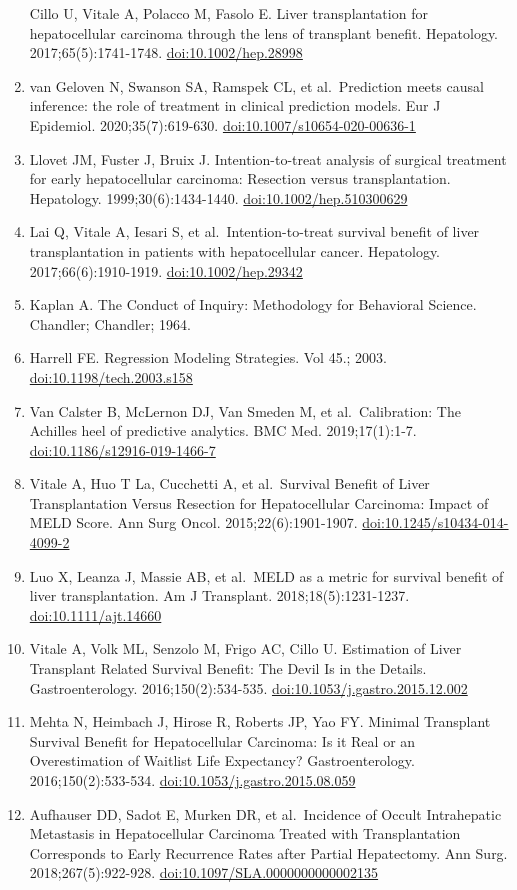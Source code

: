 \documentclass[11pt,english,]{book} %
\begin{document}
\begin{enumerate}
  Cillo U, Vitale A, Polacco M, Fasolo E. Liver transplantation for hepatocellular carcinoma through the lens of transplant benefit. Hepatology. 2017;65(5):1741-1748. \url{doi:10.1002/hep.28998}
\item
  van Geloven N, Swanson SA, Ramspek CL, et al.~Prediction meets causal inference: the role of treatment in clinical prediction models. Eur J Epidemiol. 2020;35(7):619-630. \url{doi:10.1007/s10654-020-00636-1}
\item
  Llovet JM, Fuster J, Bruix J. Intention-to-treat analysis of surgical treatment for early hepatocellular carcinoma: Resection versus transplantation. Hepatology. 1999;30(6):1434-1440. \url{doi:10.1002/hep.510300629}
\item
  Lai Q, Vitale A, Iesari S, et al.~Intention-to-treat survival benefit of liver transplantation in patients with hepatocellular cancer. Hepatology. 2017;66(6):1910-1919. \url{doi:10.1002/hep.29342}
\item
  Kaplan A. The Conduct of Inquiry: Methodology for Behavioral Science. Chandler; Chandler; 1964.
\item
  Harrell FE. Regression Modeling Strategies. Vol 45.; 2003. \url{doi:10.1198/tech.2003.s158}
\item
  Van Calster B, McLernon DJ, Van Smeden M, et al.~Calibration: The Achilles heel of predictive analytics. BMC Med. 2019;17(1):1-7. \url{doi:10.1186/s12916-019-1466-7}
\item
  Vitale A, Huo T La, Cucchetti A, et al.~Survival Benefit of Liver Transplantation Versus Resection for Hepatocellular Carcinoma: Impact of MELD Score. Ann Surg Oncol. 2015;22(6):1901-1907. \url{doi:10.1245/s10434-014-4099-2}
\item
  Luo X, Leanza J, Massie AB, et al.~MELD as a metric for survival benefit of liver transplantation. Am J Transplant. 2018;18(5):1231-1237. \url{doi:10.1111/ajt.14660}
\item
  Vitale A, Volk ML, Senzolo M, Frigo AC, Cillo U. Estimation of Liver Transplant Related Survival Benefit: The Devil Is in the Details. Gastroenterology. 2016;150(2):534-535. \url{doi:10.1053/j.gastro.2015.12.002}
\item
  Mehta N, Heimbach J, Hirose R, Roberts JP, Yao FY. Minimal Transplant Survival Benefit for Hepatocellular Carcinoma: Is it Real or an Overestimation of Waitlist Life Expectancy? Gastroenterology. 2016;150(2):533-534. \url{doi:10.1053/j.gastro.2015.08.059}
\item
  Aufhauser DD, Sadot E, Murken DR, et al.~Incidence of Occult Intrahepatic Metastasis in Hepatocellular Carcinoma Treated with Transplantation Corresponds to Early Recurrence Rates after Partial Hepatectomy. Ann Surg. 2018;267(5):922-928. \url{doi:10.1097/SLA.0000000000002135}

\end{enumerate}
\end{document}
